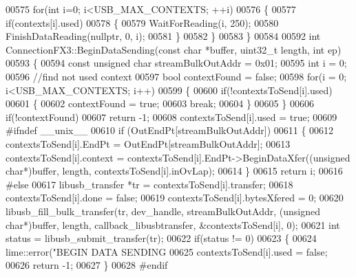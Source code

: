 \begin{DoxyCode}
{{{00575     \textcolor{keywordflow}{for}(\textcolor{keywordtype}{int} i=0; i<USB\_MAX\_CONTEXTS; ++i)
00576     \{
00577         \textcolor{keywordflow}{if}(contexts[i].used)
00578         \{
00579             WaitForReading(i, 250);
00580             FinishDataReading(\textcolor{keyword}{nullptr}, 0, i);
00581         \}
00582     \}
00583 \}
00584 
00592 \textcolor{keywordtype}{int} ConnectionFX3::BeginDataSending(\textcolor{keyword}{const} \textcolor{keywordtype}{char} *buffer, uint32\_t length, \textcolor{keywordtype}{int} ep)
00593 \{
00594     \textcolor{keyword}{const} \textcolor{keywordtype}{unsigned} \textcolor{keywordtype}{char} streamBulkOutAddr = 0x01;
00595     \textcolor{keywordtype}{int} i = 0;
00596     \textcolor{comment}{//find not used context}
00597     \textcolor{keywordtype}{bool} contextFound = \textcolor{keyword}{false};
00598     \textcolor{keywordflow}{for}(i = 0; i<USB\_MAX\_CONTEXTS; i++)
00599     \{
00600         \textcolor{keywordflow}{if}(!contextsToSend[i].used)
00601         \{
00602             contextFound = \textcolor{keyword}{true};
00603             \textcolor{keywordflow}{break};
00604         \}
00605     \}
00606     \textcolor{keywordflow}{if}(!contextFound)
00607         \textcolor{keywordflow}{return} -1;
00608     contextsToSend[i].used = \textcolor{keyword}{true};
00609 \textcolor{preprocessor}{    #ifndef \_\_unix\_\_}
00610     \textcolor{keywordflow}{if} (OutEndPt[streamBulkOutAddr])
00611     \{
00612         contextsToSend[i].EndPt = OutEndPt[streamBulkOutAddr];
00613         contextsToSend[i].context = contextsToSend[i].EndPt->BeginDataXfer((\textcolor{keywordtype}{unsigned} \textcolor{keywordtype}{char}*)buffer, length, 
      contextsToSend[i].inOvLap);
00614     \}
00615     \textcolor{keywordflow}{return} i;
00616 \textcolor{preprocessor}{    #else}
00617     libusb\_transfer *tr = contextsToSend[i].transfer;
00618     contextsToSend[i].done = \textcolor{keyword}{false};
00619     contextsToSend[i].bytesXfered = 0;
00620     libusb\_fill\_bulk\_transfer(tr, dev\_handle, streamBulkOutAddr, (\textcolor{keywordtype}{unsigned} \textcolor{keywordtype}{char}*)buffer, length, 
      callback\_libusbtransfer, &contextsToSend[i], 0);
00621     \textcolor{keywordtype}{int} status = libusb\_submit\_transfer(tr);
00622     \textcolor{keywordflow}{if}(status != 0)
00623     \{
00624         lime::error(\textcolor{stringliteral}{"BEGIN DATA SENDING %
00625         contextsToSend[i].used = \textcolor{keyword}{false};
00626         \textcolor{keywordflow}{return} -1;
00627     \}
00628 \textcolor{preprocessor}{    #endif}
}}}}
\end{DoxyCode}

